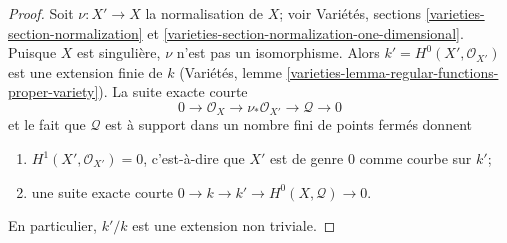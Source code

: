 \begin{proof}
Soit $\nu : X' \to X$ la normalisation de $X$; voir Variétés, sections \ref{varieties-section-normalization} et \ref{varieties-section-normalization-one-dimensional}. Puisque $X$ est singulière, $\nu$ n'est pas un isomorphisme. Alors $k' = H^0(X', \mathcal{O}_{X'})$ est une extension finie de $k$ (Variétés, lemme \ref{varieties-lemma-regular-functions-proper-variety}). La suite exacte courte $$
0 \to \mathcal{O}_X \to \nu_*\mathcal{O}_{X'} \to \mathcal{Q} \to 0
$$ et le fait que $\mathcal{Q}$ est à support dans un nombre fini de points fermés donnent \begin{enumerate} \item $H^1(X', \mathcal{O}_{X'}) = 0$, c'est-à-dire que $X'$ est de genre $0$ comme courbe sur $k'$; \item une suite exacte courte $0 \to k \to k' \to H^0(X, \mathcal{Q}) \to 0$. \end{enumerate} En particulier, $k'/k$ est une extension non triviale.


\end{proof}
